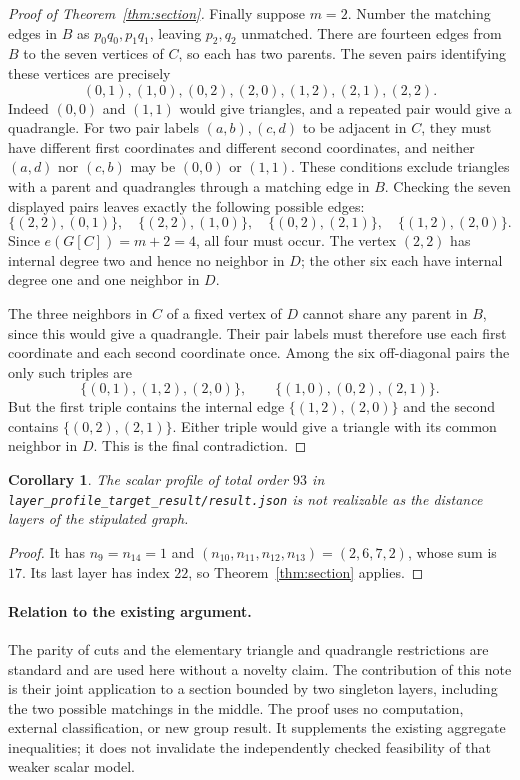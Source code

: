 \documentclass[11pt]{article}
\newtheorem{corollary}{Corollary}
\begin{document}
\begin{proof}[Proof of Theorem~\ref{thm:section}]
Finally suppose $m=2$. Number the matching edges in $B$ as
$p_0q_0,p_1q_1$, leaving $p_2,q_2$ unmatched. There are fourteen edges
from $B$ to the seven vertices of $C$, so each has two parents.
The seven pairs identifying these vertices are precisely
\[
 (0,1),(1,0),(0,2),(2,0),(1,2),(2,1),(2,2).
\]
Indeed $(0,0)$ and $(1,1)$ would give triangles, and a repeated pair
would give a quadrangle. For two pair labels $(a,b),(c,d)$ to be
adjacent in $C$, they must have different first coordinates and different
second coordinates, and neither $(a,d)$ nor $(c,b)$ may be $(0,0)$
or $(1,1)$. These conditions exclude triangles with a parent and
quadrangles through a matching edge in $B$.
Checking the seven displayed pairs leaves exactly the following possible
edges:
\[
 \{(2,2),(0,1)\},\quad \{(2,2),(1,0)\},\quad
 \{(0,2),(2,1)\},\quad \{(1,2),(2,0)\}.
\]
Since $e(G[C])=m+2=4$, all four must occur. The vertex $(2,2)$ has
internal degree two and hence no neighbor in $D$; the other six each
have internal degree one and one neighbor in $D$.

The three neighbors in $C$ of a fixed vertex of $D$ cannot share any
parent in $B$, since this would give a quadrangle. Their pair labels
must therefore use each first coordinate and each second coordinate
once. Among the six off-diagonal pairs the only such triples are
\[
 \{(0,1),(1,2),(2,0)\},\qquad
 \{(1,0),(0,2),(2,1)\}.
\]
But the first triple contains the internal edge
$\{(1,2),(2,0)\}$ and the second contains
$\{(0,2),(2,1)\}$. Either triple would give a triangle with its
common neighbor in $D$. This is the final contradiction.
\end{proof}

\begin{corollary}
The scalar profile of total order $93$ in
\texttt{layer\_profile\_target\_result/result.json} is not realizable
as the distance layers of the stipulated graph.
\end{corollary}
\begin{proof}
It has $n_9=n_{14}=1$ and
$(n_{10},n_{11},n_{12},n_{13})=(2,6,7,2)$, whose sum is $17$.
Its last layer has index $22$, so Theorem~\ref{thm:section} applies.
\end{proof}

\paragraph{Relation to the existing argument.}
The parity of cuts and the elementary triangle and quadrangle restrictions
are standard and are used here without a novelty claim. The contribution
of this note is their joint application to a section bounded by two
singleton layers, including the two possible matchings in the middle.
The proof uses no computation, external classification, or new group result.
It supplements the existing aggregate inequalities; it does not invalidate
the independently checked feasibility of that weaker scalar model.
\end{document}
